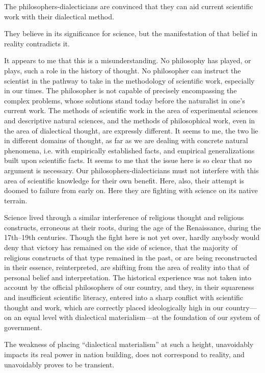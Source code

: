 The philosophers-dialecticians are convinced that they can aid current
scientific work with their dialectical method.

They believe in its significance for science, but the manifestation of that
belief in reality contradicts it.

It appears to me that this is a misunderstanding.  No philosophy has played, or
plays, such a role in the history of thought.  No philosopher can instruct the
scientist in the pathway to take in the methodology of scientific work,
especially in our times.  The philosopher is not capable of precisely
encompassing the complex problems, whose solutions stand today before the
naturalist in one's current work.  The methods of scientific work in the area
of experimental sciences and descriptive natural sciences, and the methods of
philosophical work, even in the area of dialectical thought, are expressly
different.  It seems to me, the two lie in different domains of thought, as far
as we are dealing with concrete natural phenomena, i.e. with empirically
established facts, and empirical generalizations built upon scientific facts.
It seems to me that the issue here is so clear that no argument is necessary.
Our philosophers-dialecticians must not interfere with this area of scientific
knowledge for their own benefit.  Here, also, their attempt is doomed to
failure from early on.  Here they are fighting with science on its native
terrain.

Science lived through a similar interference of religious thought and religious
constructs, erroneous at their roots, during the age of the Renaissance, during
the 17th--19th centuries.  Though the fight here is not yet over, hardly
anybody would deny that victory has remained on the side of science, that the
majority of religious constructs of that type remained in the past, or are
being reconstructed in their essence, reinterpreted, are shifting from the area
of reality into that of personal belief and interpretation.  The historical
experience was not taken into account by the official philosophers of our
country, and they, in their squareness and insufficient scientific literacy,
entered into a sharp conflict with scientific thought and work, which are
correctly placed ideologically high in our country---on an equal level with
dialectical materialism---at the foundation of our system of government.

The weakness of placing ``dialectical materialism'' at such a height,
unavoidably impacts its real power in nation building, does not correspond to
reality, and unavoidably proves to be transient.

